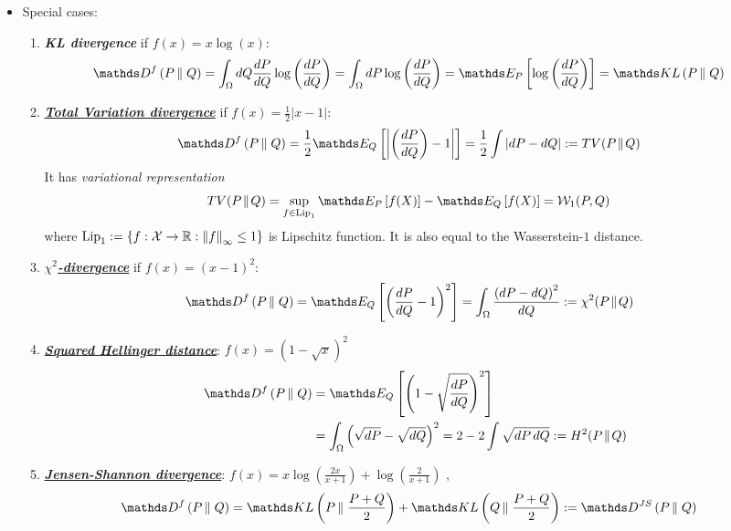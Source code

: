 \documentclass[11pt]{article}
\begin{document}
\begin{itemize}
\item Special cases:
\begin{enumerate}
\item \textbf{\emph{KL divergence}} if $f(x) = x \log(x)$:
\begin{align*}
\divg{f}{P}{Q} &= \int_{\Omega}dQ \frac{dP}{dQ} \log\paren{\frac{dP}{dQ}}  = \int_{\Omega} dP  \log\paren{\frac{dP}{dQ}} = \E{P}{\log\paren{\frac{dP}{dQ}} }=  \kl{P}{Q}
\end{align*}

\item \underline{\emph{\textbf{Total Variation divergence}}} if $ f(x)=\frac {1}{2}|x-1|$:
\begin{align}
\divg{f}{P}{Q} &= \frac{1}{2} \E{Q}{\abs{\paren{\frac{dP}{dQ}} - 1}} = \frac{1}{2} \int \abs{dP - dQ} := TV(P\!\parallel \!Q)   \label{eqn: f_divg_tv_divg}
\end{align} It has \emph{variational representation}
\begin{align}
TV(P\!\parallel \!Q) &= \sup_{f \in \text{Lip}_1}\E{P}{f(X)} - \E{Q}{f(X)} = \cW_{1}(P, Q) \label{eqn: f_divg_tv_divg_var}
\end{align} where $\text{Lip}_1 := \left\{f : {\mathcal X} \rightarrow {\mathbb R}: \left\|f\right\|_{\infty} \le 1\right\}$ is Lipschitz function. It is also equal to the Wasserstein-$1$ distance.

\item \underline{\emph{\textbf{$\chi^2$-divergence}}} if $f(x) = (x - 1)^2$:
\begin{align}
\divg{f}{P}{Q} &= \E{Q}{\paren{\frac{dP}{dQ} - 1}^2} = \int_{\Omega} \frac{\paren{dP - dQ}^2}{dQ}  :=\chi^2(P\!\parallel \!Q)  \label{eqn: f_divg_chi2_divg}
\end{align}

\item \underline{\emph{\textbf{Squared Hellinger distance}}}: $f(x) = (1 - \sqrt{x})^2$
\begin{align}
\divg{f}{P}{Q} &= \E{Q}{\paren{1 - \sqrt{\frac{dP}{dQ}}}^2} \nonumber\\
&= \int_{\Omega} \paren{\sqrt{dP} - \sqrt{dQ}}^2 = 2- 2 \int \sqrt{dP\,dQ} := H^2(P\!\parallel \!Q)   \label{eqn: f_divg_hellinger_divg}
\end{align}

\item \underline{\emph{\textbf{Jensen-Shannon divergence}}}: $f(x) = x \log(\frac{2 x}{x + 1}) + \log(\frac{2}{x + 1})$ ,
\begin{align}
\divg{f}{P}{Q} &= \kl{P}{\frac{P + Q}{2}} + \kl{Q}{\frac{P + Q}{2}}  := \divg{JS}{P}{Q}   \label{eqn: f_divg_jensen_divg}
\end{align}


\end{enumerate}
\end{itemize}
\end{document}
